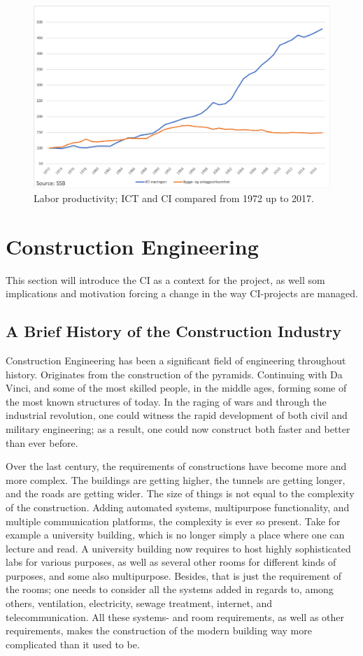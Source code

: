\begin{figure}
    \centering
    \includegraphics[width=\textwidth]{fig/ICT_BA_1972.png}
    \caption{Labor productivity; ICT and CI compared from 1972 up to 2017.}
    \label{fig:ICT_BA_1972}
\end{figure}

\section{Construction Engineering}
This section will introduce the CI as a context for the project, as well som implications and motivation forcing a change in the way CI-projects are managed. 

\subsection{A Brief History of the Construction Industry}
Construction Engineering has been a significant field of engineering throughout history. Originates from the construction of the pyramids. Continuing with Da Vinci, and some of the most skilled people, in the middle ages, forming some of the most known structures of today. In the raging of wars and through the industrial revolution, one could witness the rapid development of both civil and military engineering; as a result, one could now construct both faster and better than ever before.

Over the last century, the requirements of constructions have become more and more complex. The buildings are getting higher, the tunnels are getting longer, and the roads are getting wider. The size of things is not equal to the complexity of the construction. Adding automated systems, multipurpose functionality, and multiple communication platforms, the complexity is ever so present. Take for example a university building, which is no longer simply a place where one can lecture and read. A university building now requires to host highly sophisticated labs for various purposes, as well as several other rooms for different kinds of purposes, and some also multipurpose. Besides, that is just the requirement of the rooms; one needs to consider all the systems added in regards to, among others, ventilation, electricity, sewage treatment, internet, and telecommunication. All these systems- and room requirements, as well as other requirements, makes the construction of the modern building way more complicated than it used to be. 


